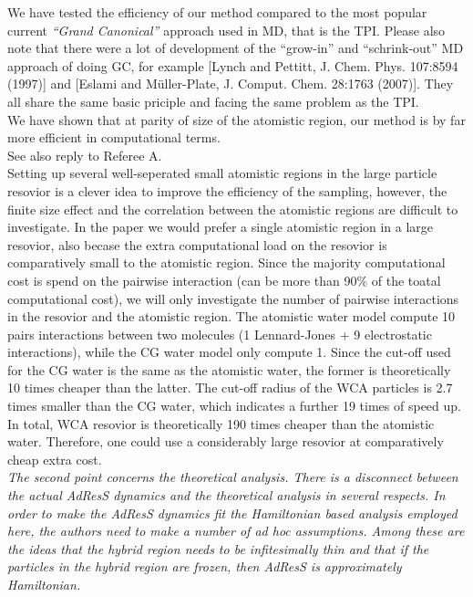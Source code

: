 \documentclass[12pt]{article}
\newcommand{\bluec}[1]{{\color{blue} #1}}
\begin{document}
We have tested the efficiency of our method compared to the most popular current {\it ``Grand Canonical''} approach used in MD, that is the \bluec{TPI}.
\bluec{Please also note that there were a lot of development of the ``grow-in'' and ``schrink-out'' MD approach
  of doing GC, for example [Lynch and Pettitt, J. Chem. Phys. 107:8594 (1997)] and [Eslami and M\"uller-Plate,
  J. Comput. Chem. 28:1763 (2007)]. They all share the same basic priciple and facing the same problem
  as the TPI.}
\\
We have shown that at parity of size of the atomistic region, our method is by far more efficient in computational terms.\\
See also reply to Referee A.\\
\bluec{
  Setting up several  well-seperated small atomistic regions in the large particle resovior is a
  clever idea to improve the efficiency of the sampling, however, the finite size effect and the
  correlation between the atomistic regions are difficult to investigate.
  In the paper we would prefer a single atomistic region in a large resovior, also becase
  the extra computational load on the resovior is comparatively small to the atomistic region. Since the
  majority computational cost is spend on the pairwise interaction (can be more than 90\% of the toatal computational cost),
  we will only investigate the number of pairwise interactions in the resovior and the atomistic region.
  The atomistic water model compute 10 pairs interactions between two molecules (1 Lennard-Jones + 9 electrostatic interactions),
  while the CG water model only compute 1. Since the cut-off used for the CG water is the same as the atomistic water,
  the former is theoretically 10 times cheaper than the latter. The cut-off radius of the WCA particles is 2.7 times smaller than
  the CG water, which indicates a further 19 times of speed up. In total, WCA resovior is theoretically
  190 times cheaper than the atomistic
  water. Therefore, one could use a considerably large resovior at comparatively cheap extra cost.
}
\\

{\color{red} {\it The second point concerns the theoretical analysis. There is a disconnect between the actual AdResS
dynamics and the theoretical analysis in several respects. In order to make the AdResS dynamics fit the
Hamiltonian based analysis employed here, the authors need to make a number of ad hoc assumptions.
Among these are the ideas that the hybrid region needs to be infitesimally thin and that if the particles
in the hybrid region are frozen, then AdResS is approximately Hamiltonian.}}\\
\end{document}

